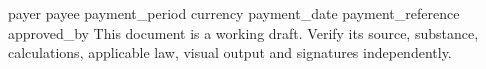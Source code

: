 \documentclass[11pt,a4paper]{article}
\begin{document}
{{payer}}
{{payee}}
{{payment_period}}
{{currency}}
{{payment_date}}
{{payment_reference}}
{{approved_by}}
This document is a working draft. Verify its source, substance, calculations, applicable law, visual output and signatures independently.
\end{document}
